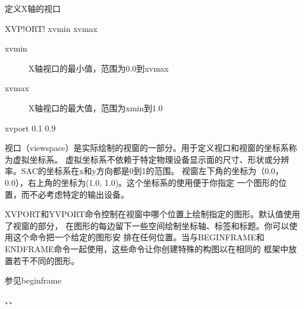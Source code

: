 \label{cmd:xvport}

定义X轴的视口

\begin{SACSTX}
XVP!ORT! xvmin xvmax
\end{SACSTX}

\begin{description}
\item [xvmin] X轴视口的最小值，范围为0.0到xvmax 
\item [xvmax] X轴视口的最大值，范围为xmin到1.0 
\end{description}

\begin{SACDFT}
xvport 0.1 0.9
\end{SACDFT}

视口（viewspace）是实际绘制的视窗的一部分。用于定义视口和视窗的坐标系称为虚拟坐标系。
虚拟坐标系不依赖于特定物理设备显示面的尺寸、形状或分辨率。SAC的坐标系在x和y方向都是0到1的范围。
视窗左下角的坐标为（0.0，0.0），右上角的坐标为(1.0, 1.0)。这个坐标系的使用便于你指定
一个图形的位置，而不必考虑特定的输出设备。

XVPORT和YVPORT命令控制在视窗中哪个位置上绘制指定的图形。默认值使用了视窗的部分，
在图形的每边留下一些空间绘制坐标轴、标签和标题。你可以使用这个命令把一个给定的图形安
排在任何位置。当与BEGINFRAME和ENDFRAME命令一起使用，这些命令让你创建特殊的构图以在相同的
框架中放置若干不同的图形。

参见beginframe

、、
